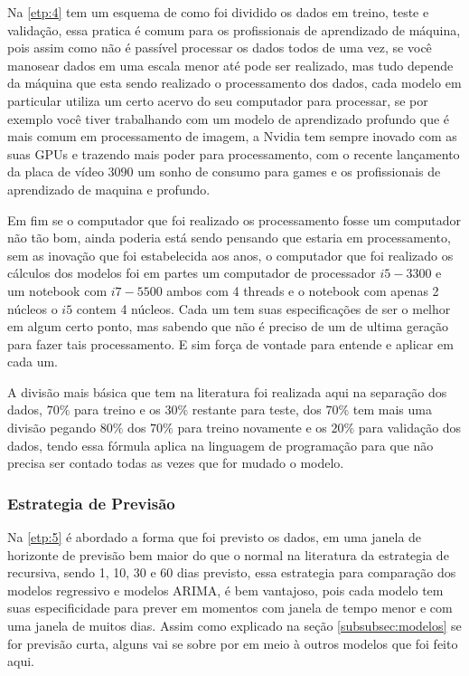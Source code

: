 Na \ref{etp:4} tem um esquema de como foi dividido os dados em treino, teste e validação, essa pratica é comum para os profissionais de aprendizado de máquina, pois assim como não é passível processar os dados todos de uma vez, se você manosear dados em uma escala menor até pode ser realizado, mas tudo depende da máquina que esta sendo realizado o processamento dos dados, cada modelo em particular utiliza um certo acervo do seu computador para processar, se por exemplo você tiver trabalhando com um modelo de aprendizado profundo que é mais comum em processamento de imagem, a Nvidia tem sempre inovado com as suas GPUs e trazendo mais poder para processamento, com o recente lançamento da placa de vídeo $3090$ um sonho de consumo para games e os profissionais de aprendizado de maquina e profundo.

Em fim se o computador que foi realizado os processamento fosse um computador não tão bom, ainda poderia está sendo pensando que estaria em processamento, sem as inovação que foi estabelecida aos anos, o computador que foi realizado os cálculos dos modelos foi em partes um computador de processador $i5-3300$ e um notebook com $i7-5500$ ambos com 4 threads e o notebook com apenas 2 núcleos o $i5$ contem 4 núcleos. Cada um tem suas especificações de ser o melhor em algum certo ponto, mas sabendo que não é preciso de um de ultima geração para fazer tais processamento. E sim força de vontade para entende e aplicar em cada um.

A divisão mais básica que tem na literatura foi realizada aqui na separação dos dados, $70\%$ para treino e os $30\%$ restante para teste, dos $70\%$ tem mais uma divisão pegando $80\%$ dos $70\%$ para treino novamente e os $20\%$ para validação dos dados, tendo essa fórmula aplica na linguagem de programação para que não precisa ser contado todas as vezes que for mudado o modelo.

\subsubsection{Estrategia de Previs\~ao}\label{subsubsec:est}

Na \ref{etp:5} é abordado a forma que foi previsto os dados, em uma janela de horizonte de previsão bem maior do que o normal na literatura da estrategia de recursiva, sendo 1, 10, 30 e 60 dias previsto, essa estrategia para comparação dos modelos regressivo e modelos ARIMA, é bem vantajoso, pois cada modelo tem suas especificidade para prever em momentos com janela de tempo menor e com uma janela de muitos dias. Assim como explicado na seção \ref{subsubsec:modelos} se for previsão curta, alguns vai se sobre por em meio à outros modelos que foi feito aqui.

